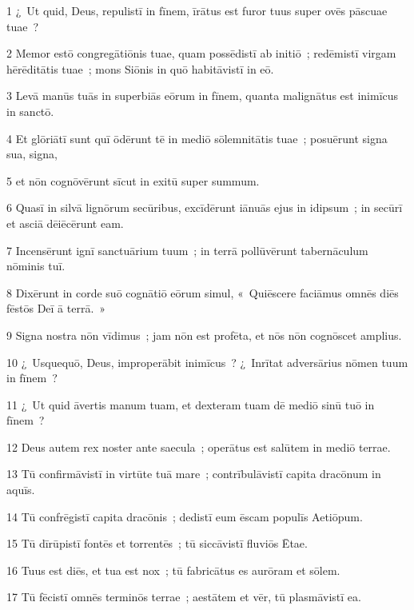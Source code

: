 \psalmVerse
  {\phantom{00}1}
  {¿~Ut quid, Deus, repulistī in fīnem, īrātus est furor tuus super ovēs pāscuae tuae~?}


\psalmVerse
  {\phantom{00}2}
  {Memor estō congregātiōnis tuae, quam possēdistī ab initiō~; redēmistī virgam hērēditātis tuae~; mons Siōnis in quō habitāvistī in eō.}


\psalmVerse
  {\phantom{00}3}
  {Levā manūs tuās in superbiās eōrum in fīnem, quanta malignātus est inimīcus in sanctō.}


\psalmVerse
  {\phantom{00}4}
  {Et glōriātī sunt quī ōdērunt tē in mediō sōlemnitātis tuae~; posuērunt signa sua, signa,}


\psalmVerse
  {\phantom{00}5}
  {et nōn cognōvērunt sīcut in exitū super summum.}


\psalmVerse
  {\phantom{00}6}
  {Quasī in silvā lignōrum secūribus, excīdērunt iānuās ejus in idipsum~; in secūrī et asciā dēiēcērunt eam.}


\psalmVerse
  {\phantom{00}7}
  {Incensērunt ignī sanctuārium tuum~; in terrā pollūvērunt tabernāculum nōminis tuī.}


\psalmVerse
  {\phantom{00}8}
  {Dixērunt in corde suō cognātiō eōrum simul, «~Quiēscere faciāmus omnēs diēs fēstōs Deī ā terrā.~»}


\psalmVerse
  {\phantom{00}9}
  {Signa nostra nōn vīdimus~; jam nōn est profēta, et nōs nōn cognōscet amplius.}


\psalmVerse
  {\phantom{0}10}
  {¿~Usquequō, Deus, improperābit inimīcus~? ¿~Inrītat adversārius nōmen tuum in fīnem~?}


\psalmVerse
  {\phantom{0}11}
  {¿~Ut quid āvertis manum tuam, et dexteram tuam dē mediō sinū tuō in fīnem~?}


\psalmVerse
  {\phantom{0}12}
  {Deus autem rex noster ante saecula~; operātus est salūtem in mediō terrae.}


\psalmVerse
  {\phantom{0}13}
  {Tū confirmāvistī in virtūte tuā mare~; contrībulāvistī capita dracōnum in aquīs.}


\psalmVerse
  {\phantom{0}14}
  {Tū confrēgistī capita dracōnis~; dedistī eum ēscam populīs Aetiōpum.}


\psalmVerse
  {\phantom{0}15}
  {Tū dīrūpistī fontēs et torrentēs~; tū siccāvistī fluviōs Ētae.}


\psalmVerse
  {\phantom{0}16}
  {Tuus est diēs, et tua est nox~; tū fabricātus es aurōram et sōlem.}


\psalmVerse
  {\phantom{0}17}
  {Tū fēcistī omnēs terminōs terrae~; aestātem et vēr, tū plasmāvistī ea.}


